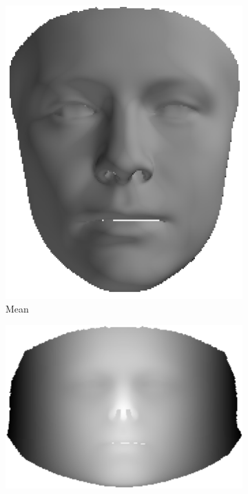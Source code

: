 \begin{figure}
    \centering
    \begin{subfigure}[b]{0.36\textwidth}
        \centering
        \includegraphics[width=\textwidth]{face_flow/images/contour_snapping/original_3d_model_mean}
        \caption{Mean}\label{subfig:face_flow_original_3d_mean}
    \end{subfigure}
    \begin{subfigure}[b]{0.63\textwidth}
        \centering
        \includegraphics[width=\textwidth]{face_flow/images/contour_snapping/cylindrically_unwrapped}

\end{subfigure}
\end{figure}
